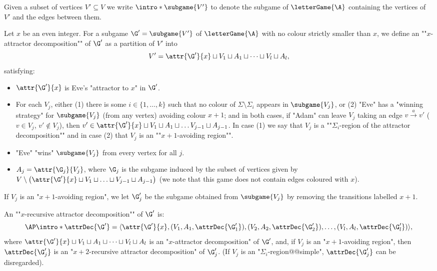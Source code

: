 \documentclass[10pt,a4paper]{amsart}
\let\ab\allowbreak
\renewcommand{\SS}{\Sigma}
\newcommand{\re}[1]{\xrightarrow{#1}}
\begin{document}
\AP Given a subset of vertices $V'\subseteq V$ we write $\intro*\subgame{V'}$ to denote the subgame of $\letterGame{\A}$ containing the vertices of $V'$ and the edges between them.

\AP Let $x$ be an even integer. For a subgame $\G' = \subgame{V'}$ of $\letterGame{\A}$ with no colour strictly smaller than $x$, we define an ""$x$-attractor decomposition"" of $\G'$ as  a partition of $V'$ into 
\[V' =\attr{\G'}{x} \sqcup V_1 \sqcup A_1 \sqcup \dots\sqcup V_l \sqcup A_l,\] 
satisfying:
\begin{itemize}
	\item \AP $\attr{\G'}{x}$ is Eve's "attractor to $x$" in $\G'$. 
	
	\item For each $V_j$, either (1) there is some $i\in \{1,\dots, k\}$ such that no colour of $\SS\setminus \SS_i$ appears in $\subgame{V_j}$, or (2) "Eve" has a "winning strategy" for $\subgame{V_j}$ (from any vertex) avoiding colour $x+1$; and in both cases, if "Adam" can leave $V_j$ taking an edge $v\re{a} v'$ ($v\in V_j$, $v'\notin V_j$), then $v'\in \attr{\G'}{x} \sqcup V_1 \sqcup A_1 \sqcup \dots  V_{j-1} \sqcup A_{j-1}$.
	In case (1) we say that $V_j$ is a ""$\SS_i$-region of the attractor decomposition"" and in case (2) that $V_j$ is an ""$x+1$-avoiding region"".
	
	\item "Eve" "wins" $\subgame{V_j}$ from every vertex for all $j$.
	
	\item $A_j = \attr{\G_j}{V_j}$, where $\G_j$ is the subgame induced by the subset of vertices given by $V\setminus \left(\attr{\G'}{x} \sqcup V_1 \ab \sqcup \dots \ab\sqcup\ab V_{j-1}\ab \sqcup A_{j-1}\right)$ (we note that this game does not contain edges coloured with $x$).
		
\end{itemize}

If $V_j$ is an "$x+1$-avoiding region", we let $\G_j'$ be the subgame obtained from $\subgame{V_j}$ by removing the transitions labelled $x+1$. %

\AP An ""$x$-recursive attractor decomposition"" of $\G'$ is:
\[ \AP \intro*\attrDec{\G'} = \langle \attr{\G'}{x}, (V_1,A_1, \attrDec{\G_1'}), (V_2,A_2, \attrDec{\G_2'}),\dots , (V_l,A_l, \attrDec{\G_l'})\rangle, \]
where $\attr{\G'}{x} \sqcup V_1 \sqcup A_1 \sqcup \dots\sqcup V_l \sqcup A_l$ is an "$x$-attractor decomposition" of $\G'$, and, if $V_j$ is an "$x+1$-avoiding region", then $\attrDec{\G_j'}$ is an "$x+2$-recursive attractor decomposition" of $\G_j'$. (If $V_j$ is an "$\SS_i$-region@@simple", $\attrDec{\G_j'}$ can be disregarded).
\end{document}
